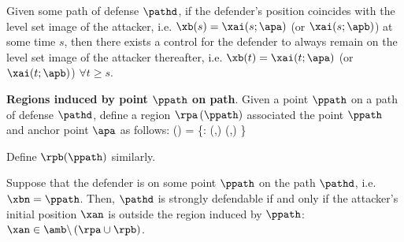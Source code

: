 \begin{rem}
Given some path of defense $\pathd$, if the defender's position coincides with the level set image of the attacker, i.e. $\xb(s) = \xai(s;\apa)$ (or $\xai(s;\apb)$) at some time $s$, then there exists a control for the defender to always remain on the level set image of the attacker thereafter, i.e. $\xb(t) = \xai(t;\apa)$ (or $\xai(t;\apb)$) $\forall t\ge s$.
\end{rem}

\begin{defn} %
\label{def:d_win_region}
\textbf{Regions induced by point $\ppath$ on path}. Given a point $\ppath$ on a path of defense $\pathd$, define a region $\rpa\left(\ppath\right)$ associated the point $\ppath$ and anchor point $\apa$ as follows:
\bq
\rpa\left(\ppath\right) = \left\{\x: \ta(\x,\apa) \leq \tb(\ppath,\apa) \right\}
\eq

Define $\rpb(\ppath)$ similarly.
\end{defn}

\begin{lem}
\label{lem:d_winning_region}
Suppose that the defender is on some point $\ppath$ on the path $\pathd$, i.e. $\xbn = \ppath$. Then, $\pathd$ is strongly defendable if and only if the attacker's initial position $\xan$ is outside the region induced by $\ppath$: $\xan\in\amb\backslash\left(\rpa \cup \rpb\right)$.
\end{lem}

